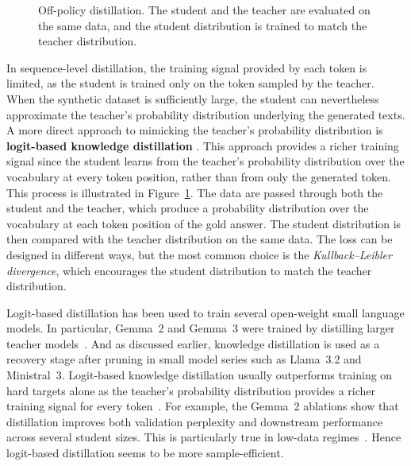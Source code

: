 \begin{figure}[!ht]
    \caption{Off-policy distillation. The student and the teacher are evaluated on the same data, and the student distribution is trained to match the teacher distribution.}
    \label{fig:off-policy-distillation}
\end{figure}
In sequence-level distillation, the training signal provided by each token is limited, 
as the student is trained only on the token sampled by the teacher. 
When the synthetic dataset is sufficiently large, the student can nevertheless 
approximate the teacher's probability distribution underlying the generated texts.
A more direct approach to mimicking the teacher's probability distribution 
is \textbf{logit-based knowledge distillation} \citep{distillation}. 
This approach provides a richer 
training signal since the student learns from the teacher's probability 
distribution over the vocabulary at every token position, rather than from only 
the generated token. This process is illustrated in Figure~\ref{fig:off-policy-distillation}.
The data are passed through both the student and the teacher, which produce
a probability distribution over the vocabulary at each token position of 
the gold answer. The student distribution is then compared with the teacher 
distribution on the same data. The loss can be designed in different ways, 
but the most common choice is the \textit{Kullback--Leibler divergence}, 
which encourages the student distribution to match the teacher distribution.

Logit-based distillation has been used to train several open-weight small language 
models. In particular, Gemma~2 and Gemma~3 were trained by distilling larger teacher 
models~\citep{gemmateam2024gemma2,gemmateam2025gemma3technicalreport}. 
And as discussed earlier, knowledge distillation is used as a recovery stage 
after pruning in small model series such as Llama~3.2 and Ministral~3. 
Logit-based knowledge distillation usually outperforms 
training on hard targets alone as the teacher's probability distribution provides 
a richer training signal for every token~\citep{gemmateam2024gemma2,anshumann2025sparselogit}.
For example, the Gemma~2 ablations show that distillation improves both validation 
perplexity and downstream performance across several student sizes. This is
particularly true in low-data regimes~\citep{liu2026understandingkd}.
Hence logit-based distillation seems to be more sample-efficient.

